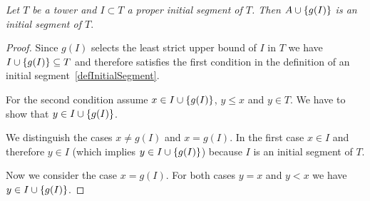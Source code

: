 \begin{lemma}
    \label{thmTowerInitialSegmentEnlargement}
    \emph{Let $T$ be a tower and $I \subset T$ a proper initial segment of $T$. Then
    $A \cup \left\{g(I)\right\}$ is an initial segment of $T$}.

    \begin{proof}
        Since $g(I)$ selects the least strict upper bound of $I$ in $T$ we have
        $I \cup \left\{g(I)\right\} \subseteq T$ and therefore satisfies the first
        condition in the definition of an initial
        segment~\ref{defInitialSegment}.

        For the second condition assume $x \in I \cup \left\{g(I)\right\}$, $y \le x$ and
        $y \in T$. We have to show that $y \in I \cup \left\{g(I)\right\}$.

        We distinguish the cases $x \ne g(I)$ and $x = g(I)$. In the first case
        $x \in I$ and therefore $y \in I$ (which implies $y \in I \cup
        \left\{g(I)\right\}$) because $I$ is an initial segment of $T$.

        Now we consider the case $x = g(I)$. For both cases $y = x$ and $y < x$
        we have $y \in I \cup \left\{g(I)\right\}$.
    \end{proof}
\end{lemma}



